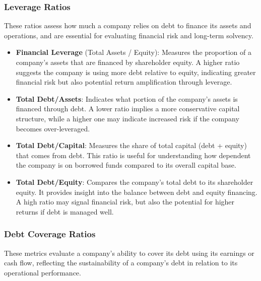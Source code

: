 \documentclass[11pt,english,a4paper,hidelinks]{book}
\begin{document}
\subsubsection{Leverage Ratios}
These ratios assess how much a company relies on debt to finance its assets and operations, and are essential for evaluating financial risk and long-term solvency.
\begin{itemize}
    \item \textbf{Financial Leverage} (Total Assets / Equity): Measures the proportion of a company's assets that are financed by shareholder equity. A higher ratio suggests the company is using more debt relative to equity, indicating greater financial risk but also potential return amplification through leverage.
    
    \item \textbf{Total Debt/Assets}: Indicates what portion of the company's assets is financed through debt. A lower ratio implies a more conservative capital structure, while a higher one may indicate increased risk if the company becomes over-leveraged.
    
    \item \textbf{Total Debt/Capital}: Measures the share of total capital (debt + equity) that comes from debt. This ratio is useful for understanding how dependent the company is on borrowed funds compared to its overall capital base.
    
    \item \textbf{Total Debt/Equity}: Compares the company's total debt to its shareholder equity. It provides insight into the balance between debt and equity financing. A high ratio may signal financial risk, but also the potential for higher returns if debt is managed well.
\end{itemize}

\subsubsection{Debt Coverage Ratios}
These metrics evaluate a company's ability to cover its debt using its earnings or cash flow, reflecting the sustainability of a company's debt in relation to its operational performance.
\end{document}
